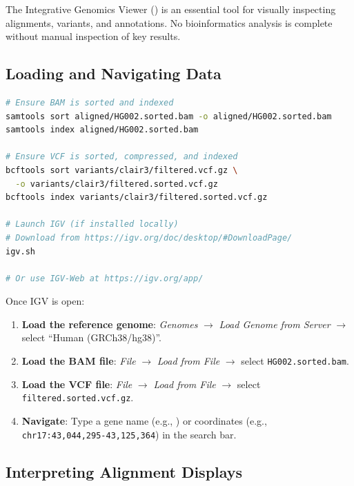 The Integrative Genomics Viewer () is an essential tool for visually inspecting alignments, variants, and annotations. No bioinformatics analysis is complete without manual inspection of key results.

\subsection{Loading and Navigating Data}
\label{subsec:diyanalysis:igv_basics}

\begin{lstlisting}[language=bash,caption={Preparing files for IGV and launching from the command line.},label=lst:diy-igv-prep]
# Ensure BAM is sorted and indexed
samtools sort aligned/HG002.sorted.bam -o aligned/HG002.sorted.bam
samtools index aligned/HG002.sorted.bam

# Ensure VCF is sorted, compressed, and indexed
bcftools sort variants/clair3/filtered.vcf.gz \
  -o variants/clair3/filtered.sorted.vcf.gz
bcftools index variants/clair3/filtered.sorted.vcf.gz

# Launch IGV (if installed locally)
# Download from https://igv.org/doc/desktop/#DownloadPage/
igv.sh

# Or use IGV-Web at https://igv.org/app/
\end{lstlisting}

Once IGV is open:
\begin{enumerate}[nosep]
  \item \textbf{Load the reference genome}: \textit{Genomes} $\rightarrow$ \textit{Load Genome from Server} $\rightarrow$ select ``Human (GRCh38/hg38)''.
  \item \textbf{Load the BAM file}: \textit{File} $\rightarrow$ \textit{Load from File} $\rightarrow$ select \texttt{HG002.sorted.bam}.
  \item \textbf{Load the VCF file}: \textit{File} $\rightarrow$ \textit{Load from File} $\rightarrow$ select \texttt{filtered.sorted.vcf.gz}.
  \item \textbf{Navigate}: Type a gene name (e.g., \gene{BRCA1}) or coordinates (e.g., \texttt{chr17:43,044,295-43,125,364}) in the search bar.
\end{enumerate}

\subsection{Interpreting Alignment Displays}
\label{subsec:diyanalysis:igv_interpret}

